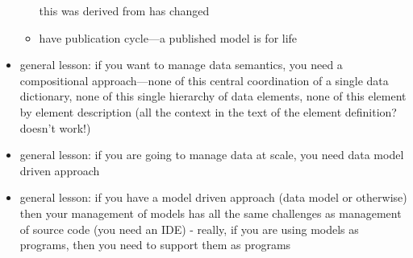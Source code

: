 \begin{itemize}
\begin{itemize}
    this was derived from has changed
  \item have publication cycle---a published model is for life
  \end{itemize}
\item general lesson: if you want to manage data semantics, you need a
  compositional approach---none of this central coordination of a
  single data dictionary, none of this single hierarchy of data
  elements, none of this element by element description (all the
  context in the text of the element definition?  doesn't work!)
\item general lesson: if you are going to manage data at scale, you
  need data model driven approach
\item general lesson: if you have a model driven approach (data model
  or otherwise) then your management of models has all the same
  challenges as management of source code (you need an IDE) - really,
  if you are using models as programs, then you need to support them
  as programs
\end{itemize}